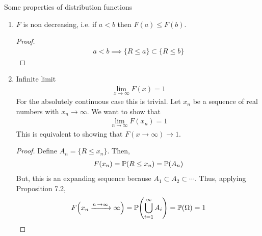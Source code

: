 Some properties of distribution functions
\begin{enumerate}
    \item $F$ is non decreasing, i.e. if $a < b$ then $F(a) \le F(b)$.
    \begin{proof}
        \begin{align}
            a < b \implies \{ R \le a \} \subset \{ R \le b \}
        \end{align}
    \end{proof}
    \item Infinite limit
    \begin{align}
        \lim_{x \to \infty} F(x) = 1
    \end{align}
    For the absolutely continuous case this is trivial. Let $x_n$ be a sequence of real numbers with $x_n \to \infty$. We want to show that
    \begin{align}
        \lim_{n \to\infty} F(x_n) = 1
    \end{align}
    This is equivalent to showing that $F(x \to \infty) \to 1$.
    \begin{proof}
        Define $A_n = \{ R \le x_n \}$. Then,
        \begin{align}
            F(x_n) = \mathbb{P}(R \le x_n) = \mathbb{P}(A_n)
        \end{align}
        But, this is an expanding sequence because $A_1 \subset A_2 \subset \cdots$. Thus, applying Proposition 7.2,
        \begin{align}
            F\qty(x_n \ce{->[n \to \infty]} \infty) = \probability\qty(\bigcup_{i=1}^\infty A_i) = \probability(\Omega) = 1
        \end{align}
    \end{proof}
\end{enumerate}
